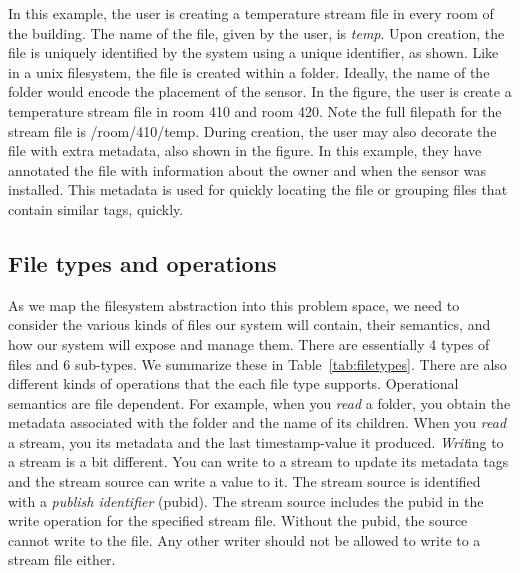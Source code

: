 In this example, the user is creating a temperature stream file in every room of the building.  The name of the file, given by the user,
is \emph{temp}.  Upon creation, the file is uniquely identified by the system using a unique identifier, as shown.  Like in a unix filesystem, the
file is created within a folder.  Ideally, the name of the folder would encode the placement of the sensor.  In the figure, the 
user is create a temperature stream file in room 410 and room 420.  Note the full filepath for the stream file is /room/410/temp.
During creation, the user may also decorate the file with extra metadata, also shown in the figure.  In this example, they have annotated
the file with information about the owner and when the sensor was installed.   This metadata is used for quickly locating the file
or grouping files that contain similar tags, quickly.

\subsection{File types and operations}
As we map the filesystem abstraction into this problem space, we need to consider the various kinds of files our system will contain,
their semantics, and how our system will expose and manage them.  There are essentially 4 types of files and 6 sub-types.  We summarize
these in Table~\ref{tab:filetypes}.  There are also different kinds of operations that the each file type supports.  Operational semantics
are file dependent.  For example, when you \emph{read} a folder, you obtain the metadata associated with the folder and the name
of its children.  When you \emph{read} a stream, you its metadata and the last timestamp-value it produced.  \emph{Writ}ing to a stream
is a bit different.  You can write to a stream to update its metadata tags and the stream source can write a value to it.  The stream
source is identified with a \emph{publish identifier} (pubid).  The stream source includes the pubid in the write operation for 
the specified stream file.  Without the pubid, the source cannot write to the file.  Any other writer should not be allowed to write to 
a stream file either.  

